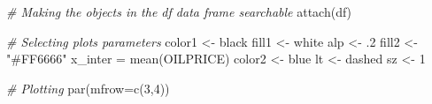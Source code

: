 \documentclass[
]{article}
\newenvironment{Shaded}{\begin{snugshade}}{\end{snugshade}}
\newcommand{\AttributeTok}[1]{\textcolor[rgb]{0.77,0.63,0.00}{#1}}
\newcommand{\CommentTok}[1]{\textcolor[rgb]{0.56,0.35,0.01}{\textit{#1}}}
\newcommand{\DecValTok}[1]{\textcolor[rgb]{0.00,0.00,0.81}{#1}}
\newcommand{\FunctionTok}[1]{\textcolor[rgb]{0.00,0.00,0.00}{#1}}
\newcommand{\NormalTok}[1]{#1}
\newcommand{\OtherTok}[1]{\textcolor[rgb]{0.56,0.35,0.01}{#1}}
\newcommand{\StringTok}[1]{\textcolor[rgb]{0.31,0.60,0.02}{#1}}
\begin{document}
\begin{Shaded}
\begin{Highlighting}[]
\CommentTok{\# Making the objects in the \textquotesingle{}df\textquotesingle{} data frame searchable}
\FunctionTok{attach}\NormalTok{(df)}

\CommentTok{\# Selecting plot\textquotesingle{}s parameters}
\NormalTok{color1 }\OtherTok{\textless{}{-}} \StringTok{\textquotesingle{}black\textquotesingle{}}
\NormalTok{fill1 }\OtherTok{\textless{}{-}} \StringTok{\textquotesingle{}white\textquotesingle{}}
\NormalTok{alp }\OtherTok{\textless{}{-}}\NormalTok{ .}\DecValTok{2}
\NormalTok{fill2 }\OtherTok{\textless{}{-}} \StringTok{"\#FF6666"}
\NormalTok{x\_inter }\OtherTok{=} \FunctionTok{mean}\NormalTok{(OILPRICE) }
\NormalTok{color2 }\OtherTok{\textless{}{-}} \StringTok{\textquotesingle{}blue\textquotesingle{}}
\NormalTok{lt }\OtherTok{\textless{}{-}} \StringTok{\textquotesingle{}dashed\textquotesingle{}}
\NormalTok{sz }\OtherTok{\textless{}{-}} \DecValTok{1}

\CommentTok{\# Plotting}
\FunctionTok{par}\NormalTok{(}\AttributeTok{mfrow=}\FunctionTok{c}\NormalTok{(}\DecValTok{3}\NormalTok{,}\DecValTok{4}\NormalTok{))}


\end{Highlighting}
\end{Shaded}
\end{document}
